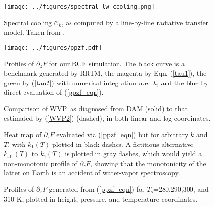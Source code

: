 \documentclass[10pt]{article}
\newcommand{\eqnref}[1]{(\ref{#1})}
\newcommand{\ppz}{\ensuremath{\partial_z}}
\newcommand{\FLW}{\ensuremath{F}}
\newcommand{\cool}{\ensuremath{\mathcal{C}}}
\newcommand{\Ts}{\ensuremath{T_\mathrm{s}}}
\newcommand{\WVP}{\ensuremath{\mathrm{WVP}}}
\begin{document}
\begin{figure}[h]
	\begin{center}
			\texttt{[image: ../figures/spectral\_lw\_cooling.png]}
		\caption{Spectral cooling $\cool_k$, as computed by a line-by-line radiative transfer model. Taken from \cite{huang2013}.
		\label{lbl_cooling}
		}
	\end{center}
\end{figure}

\begin{figure}[h]
	\begin{center}
			\texttt{[image: ../figures/ppzf.pdf]}
		\caption{Profiles of $\ppz \FLW$ for our RCE simulation. The black curve is a benchmark generated by RRTM, the magenta by Eqn. \eqnref{tau1}, the green by \eqnref{tau2} with numerical integration over $k$, and the blue by direct evaluation of \eqnref{ppzf_eqn}.
		\label{ppzf}
		}
	\end{center}
\end{figure}


\begin{figure}[h]
	\begin{center}
		\caption{Comparison of \WVP\ as diagnosed from DAM (solid) to that estimated by \eqnref{WVP2} (dashed), in both linear and log coordinates.
		\label{wvp_check}
		}
	\end{center}
\end{figure}

\begin{figure}[h]
	\begin{center}
		\caption{Heat map of  $\ppz F$ evaluated via \eqnref{ppzf_eqn} but for arbitrary $k$ and $T$, with $k_1(T)$ plotted in black dashes. A fictitious alternative $k_{\mathrm{alt}}(T)$ to $k_1(T)$ is plotted in gray dashes, which would yield a non-monotonic profile of $\ppz F$, showing that the monotonicity of the latter on Earth is an accident of water-vapor spectroscopy.
		\label{ppzf_phase}
		}
	\end{center}
\end{figure}

\begin{figure}[h]
	\begin{center}
		\caption{Profiles of  $\ppz F$ generated from \eqnref{ppzf_eqn}  for \Ts=280,290,300, and 310 K, plotted in height, pressure, and temperature coordinates.
		\label{ppzf_tinv_theory}
		}
	\end{center}
\end{figure}
\end{document}
